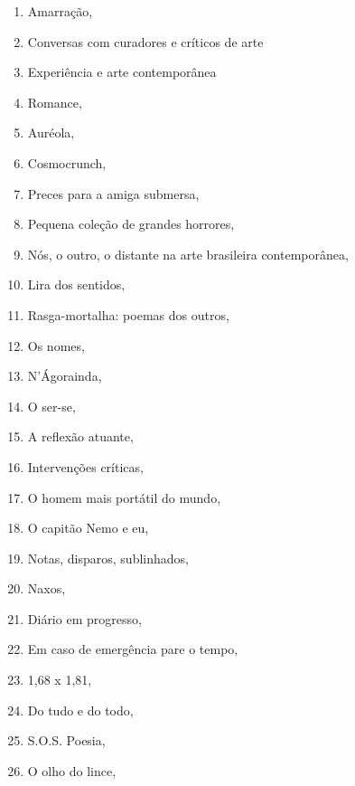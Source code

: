 \begin{multicols}{2}
\begin{enumerate}
\item Amarração, {}
\item Conversas com curadores e críticos de arte
\item Experiência e arte contemporânea
\item Romance, {}
\item Auréola, {}
\item Cosmocrunch, {}
\item Preces para a amiga submersa, {}
\item Pequena coleção de grandes horrores, {}
\item Nós, o outro, o distante na arte brasileira contemporânea, {}
\item Lira dos sentidos, {}
\item Rasga-mortalha: poemas dos outros, {}
\item Os nomes, {}
\item N’Ágorainda, {}
\item O ser-se, {}
\item A reflexão atuante, {}
\item Intervenções críticas, {}
\item O homem mais portátil do mundo, {}
\item O capitão Nemo e eu, {}
\item Notas, disparos, sublinhados, {}
\item Naxos, {}
\item Diário em progresso, {}
\item Em caso de emergência pare o tempo, {}
\item 1,68 x 1,81, {}
\item Do tudo e do todo, {}
\item S.O.S. Poesia, {}
\item O olho do lince, {}

\end{enumerate}
\end{multicols}
